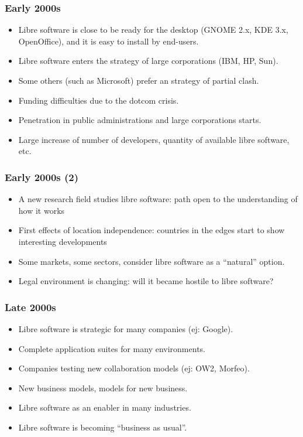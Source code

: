\begin{frame}
  \frametitle{Early 2000s}

  \begin{itemize}
  \item Libre software is close to be ready for the desktop
    (GNOME 2.x, KDE 3.x, OpenOffice), and it is easy to install by
    end-users.
  \item Libre software enters the strategy of large corporations (IBM,
    HP, Sun).
  \item Some others (such as Microsoft) prefer an strategy of partial
    clash.
  \item Funding difficulties due to the dotcom crisis.
  \item Penetration in public administrations and large corporations
    starts.
  \item Large increase of number of developers, quantity of available
    libre software, etc.
  \end{itemize}

\end{frame}



\begin{frame}
  \frametitle{Early 2000s (2)}

  \begin{itemize}
  \item A new research field studies libre software: path open to
    the understanding of how it works
  \item First effects of location independence: countries in the edges
    start to show interesting developments
  \item Some markets, some sectors, consider libre software as a
    ``natural'' option.
  \item Legal environment is changing: will it became hostile to libre
    software?
  \end{itemize}

\end{frame}



\begin{frame}
  \frametitle{Late 2000s}

  \begin{itemize}
  \item Libre software is strategic for many companies (ej: Google).
  \item Complete application suites for many environments.
  \item Companies testing new collaboration models (ej: OW2, Morfeo).
  \item New business models, models for new business.
  \item Libre software as an enabler in many industries.
  \item Libre software is becoming ``business as usual''.
  \end{itemize}

\end{frame}

